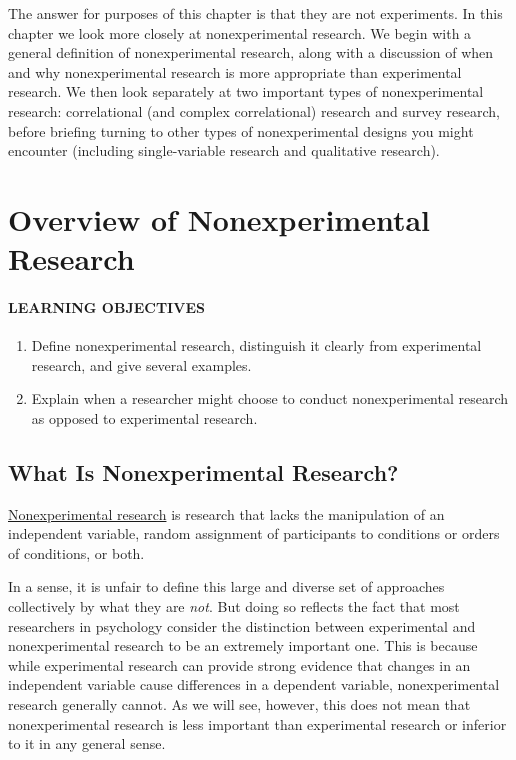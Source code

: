 \documentclass[
]{krantz}
\providecommand{\tightlist}{%
  \setlength{\itemsep}{0pt}\setlength{\parskip}{0pt}}
\begin{document}
The answer for purposes of this chapter is that they are not experiments. In this chapter we look more closely at nonexperimental research. We begin with a general definition of nonexperimental research, along with a discussion of when and why nonexperimental research is more appropriate than experimental research. We then look separately at two important types of nonexperimental research: correlational (and complex correlational) research and survey research, before briefing turning to other types of nonexperimental designs you might encounter (including single-variable research and qualitative research).

\section{Overview of Nonexperimental Research}\label{overview-of-nonexperimental-research}

\paragraph*{LEARNING OBJECTIVES}\label{learning-objectives-18}

\begin{enumerate}
\def\labelenumi{\arabic{enumi}.}
\tightlist
\item
  Define nonexperimental research, distinguish it clearly from experimental research, and give several examples.
\item
  Explain when a researcher might choose to conduct nonexperimental research as opposed to experimental research.
\end{enumerate}

\subsection*{What Is Nonexperimental Research?}\label{what-is-nonexperimental-research}


\hyperref[nonexperimental-research]{Nonexperimental research} is research that lacks the manipulation of an independent variable, random assignment of participants to conditions or orders of conditions, or both.

In a sense, it is unfair to define this large and diverse set of approaches collectively by what they are \emph{not}. But doing so reflects the fact that most researchers in psychology consider the distinction between experimental and nonexperimental research to be an extremely important one. This is because while experimental research can provide strong evidence that changes in an independent variable cause differences in a dependent variable, nonexperimental research generally cannot. As we will see, however, this does not mean that nonexperimental research is less important than experimental research or inferior to it in any general sense.
\end{document}
